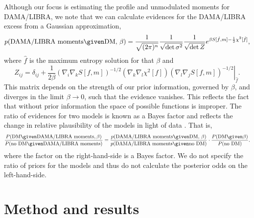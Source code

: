 \documentclass{article}
\begin{document}
Although our focus is estimating the profile and unmodulated moments for DAMA/LIBRA, we note that we can calculate evidences for the DAMA/LIBRA excess from a Gaussian approximation\cite{BLTJ:BLTJ1338},
\begin{equation}
p(\text{DAMA/LIBRA moments} \given \text{DM, $\beta$}) = \frac{1}{\sqrt{(2\pi)^n}}\frac{1}{\sqrt{\text{det}\,\sigma^2}} \frac{1}{\sqrt{\text{det}\,Z}} e^{\beta S[\hat f, m] -\frac12 \chi^2[\hat f]},
\end{equation}
where $\hat f$ is the maximum entropy solution for that $\beta$ and
\begin{equation}
Z_{ij} = \delta_{ij} + \frac{1}{2\beta} \left.\left(\nabla_i\nabla_k S[f, m]\right)^{-1/2} \left(\nabla_k\nabla_l \chi^2[f]\right) \left(\nabla_l\nabla_j S[f, m]\right)^{-1/2}\right|_{\hat f}.
\end{equation}
This matrix depends on the strength of our prior information, governed by $\beta$, and diverges in the limit $\beta \to 0$, such that the evidence vanishes. This reflects the fact that without prior information the space of possible functions is improper. The ratio of evidences for two models is known as a Bayes factor and reflects the change in relative plausibility of the models in light of data . That is,
\begin{equation}
\frac{
P(\text{DM} \given \text{DAMA/LIBRA moments}, \beta)
}{
P(\text{no DM} \given \text{DAMA/LIBRA moments})
}
=
\frac{
p(\text{DAMA/LIBRA moments} \given \text{DM, $\beta$})
}{
p(\text{DAMA/LIBRA moments} \given \text{no DM})
} \cdot
\frac{
P(\text{DM} \given \beta)
}{
P(\text{no DM})
}.
\end{equation}
where the factor on the right-hand-side is a Bayes factor. We do not specify the ratio of priors for the models and thus do not calculate the posterior odds on the left-hand-side.

\section{Method and results}\label{sec:results}
\end{document}
